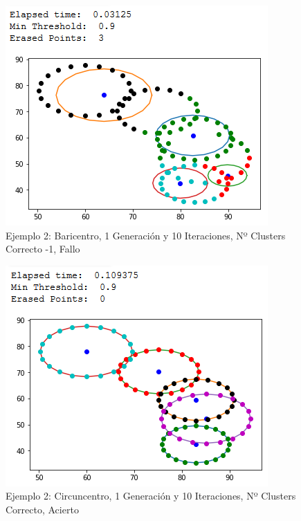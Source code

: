 \documentclass[conference,a4paper]{IEEEtran}
\begin{document}
\begin{figure}[H]
\centering
\includegraphics[scale=0.65]{Experimentacion/Ejemplo2/ej2_b_1_10_lc_wrong}
\caption{Ejemplo 2: Baricentro, 1 Generación y 10 Iteraciones,  Nº Clusters Correcto -1, Fallo\\}
\end{figure}

\begin{figure}[H]
\centering
\includegraphics[scale=0.65]{Experimentacion/Ejemplo2/ej2_c_1_10_cc_correct}
\caption{Ejemplo 2: Circuncentro, 1 Generación y 10 Iteraciones,  Nº Clusters Correcto, Acierto\\}
\end{figure}
\end{document}
